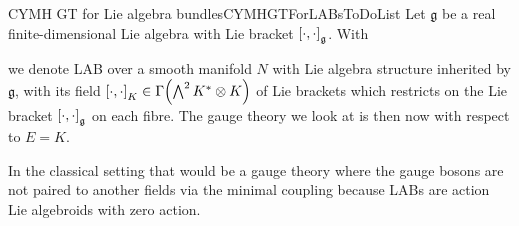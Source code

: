 \begin{situations}{CYMH GT for Lie algebra bundles}{CYMHGTForLABsToDoList}
Let $\mathfrak{g}$ be a real finite-dimensional Lie algebra with Lie bracket $\mleft[ \cdot, \cdot \mright]_{\mathfrak{g}}$. With
\begin{center}
\end{center}
we denote LAB over a smooth manifold $N$ with Lie algebra structure inherited by $\mathfrak{g}$, with its field $\mleft[ \cdot, \cdot \mright]_K \in \Gamma\mleft(\bigwedge^2 K^* \otimes K \mright)$ of Lie brackets which restricts on the Lie bracket $\mleft[ \cdot, \cdot \mright]_{\mathfrak{g}}$ on each fibre. The gauge theory we look at is then now with respect to $E = K$.
%

In the classical setting that would be a gauge theory where the gauge bosons are not paired to another fields via the minimal coupling because LABs are action Lie algebroids with zero action.


\end{situations}
